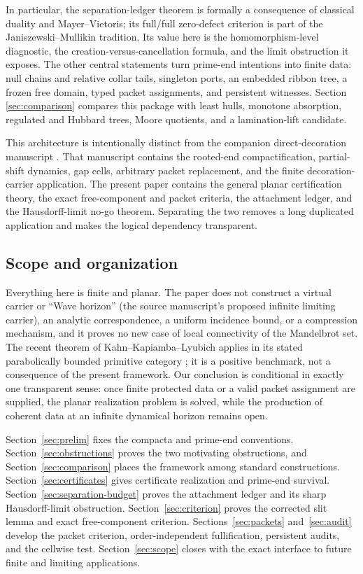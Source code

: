 \documentclass[11pt,reqno]{amsart}
\theoremstyle{definition}
\theoremstyle{remark}
\begin{document}
In particular, the separation-ledger theorem is formally a consequence of
classical duality and Mayer--Vietoris; its full/full zero-defect criterion
is part of the Janiszewski--Mullikin tradition.  Its value here is the
homomorphism-level diagnostic, the creation-versus-cancellation formula,
and the limit obstruction it exposes.  The other central statements
turn prime-end intentions into finite data: null chains and relative
collar tails, singleton ports, an embedded ribbon tree, a frozen free domain,
typed packet assignments, and persistent witnesses.  Section
\ref{sec:comparison} compares this package with least hulls, monotone
absorption, regulated and Hubbard trees, Moore quotients, and a
lamination-lift candidate.

This architecture is intentionally distinct from the companion
direct-decoration manuscript \cite{Wes26}.  That manuscript contains the rooted-end
compactification, partial-shift dynamics, gap cells, arbitrary packet
replacement, and the finite decoration-carrier application.  The present
paper contains the general planar certification theory, the exact
free-component and packet criteria, the attachment ledger, and the
Hausdorff-limit no-go theorem.  Separating the two removes a long duplicated
application and makes the logical dependency transparent.

\subsection{Scope and organization}

Everything here is finite and planar.  The paper does not construct a
virtual carrier or ``Wave horizon'' (the source manuscript's proposed
infinite limiting carrier), an analytic correspondence, a uniform
incidence bound, or a compression mechanism, and it proves no new case of
local connectivity of the Mandelbrot set.  The recent theorem of
Kahn--Kapiamba--Lyubich applies in its stated parabolically bounded primitive
category \cite{KKL26}; it is a positive benchmark, not a consequence of the
present framework.  Our conclusion is conditional in exactly one transparent
sense: once finite protected data or a valid packet assignment are supplied,
the planar realization problem is solved, while the production of coherent
data at an infinite dynamical horizon remains open.

Section~\ref{sec:prelim} fixes the compacta and prime-end conventions.
Section~\ref{sec:obstructions} proves the two motivating obstructions, and
Section~\ref{sec:comparison} places the framework among standard
constructions.  Section~\ref{sec:certificates} gives certificate realization
and prime-end survival.  Section~\ref{sec:separation-budget} proves the
attachment ledger and its sharp Hausdorff-limit obstruction.
Section~\ref{sec:criterion} proves the corrected slit lemma and exact
free-component criterion.  Sections~\ref{sec:packets} and~\ref{sec:audit}
develop the packet criterion, order-independent fullification, persistent
audits, and the cellwise test.  Section~\ref{sec:scope} closes with the exact
interface to future finite and limiting applications.
\end{document}
